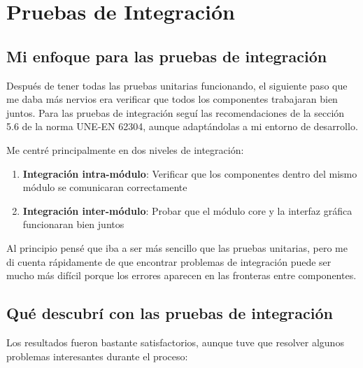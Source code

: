 \newpage

\section{Pruebas de Integración}

\subsection{Mi enfoque para las pruebas de integración}

Después de tener todas las pruebas unitarias funcionando, el siguiente paso que me daba más nervios era verificar que todos los componentes trabajaran bien juntos. Para las pruebas de integración seguí las recomendaciones de la sección 5.6 de la norma UNE-EN 62304, aunque adaptándolas a mi entorno de desarrollo.

Me centré principalmente en dos niveles de integración:

\begin{enumerate}
    \item \textbf{Integración intra-módulo}: Verificar que los componentes dentro del mismo módulo se comunicaran correctamente
    \item \textbf{Integración inter-módulo}: Probar que el módulo core y la interfaz gráfica funcionaran bien juntos
\end{enumerate}

Al principio pensé que iba a ser más sencillo que las pruebas unitarias, pero me di cuenta rápidamente de que encontrar problemas de integración puede ser mucho más difícil porque los errores aparecen en las fronteras entre componentes.

\subsection{Qué descubrí con las pruebas de integración}

Los resultados fueron bastante satisfactorios, aunque tuve que resolver algunos problemas interesantes durante el proceso:

